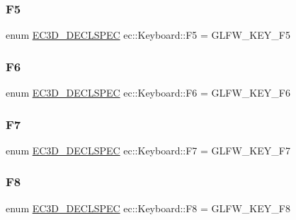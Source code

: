 \mbox{\label{classec_1_1_keyboard_a7a9bd546b5eeba38a587303293246bb7}} 
\subsubsection{\texorpdfstring{F5}{F5}}
{\footnotesize\ttfamily enum \mbox{\hyperlink{_common_8h_aac42573e202ca3dd4d259c81691e2369}{E\+C3\+D\+\_\+\+D\+E\+C\+L\+S\+P\+EC}} ec\+::\+Keyboard\+::\+F5 = G\+L\+F\+W\+\_\+\+K\+E\+Y\+\_\+\+F5}

\mbox{\label{classec_1_1_keyboard_a02fe21453cf1fd9a9c5f181ec9a8f714}} 
\subsubsection{\texorpdfstring{F6}{F6}}
{\footnotesize\ttfamily enum \mbox{\hyperlink{_common_8h_aac42573e202ca3dd4d259c81691e2369}{E\+C3\+D\+\_\+\+D\+E\+C\+L\+S\+P\+EC}} ec\+::\+Keyboard\+::\+F6 = G\+L\+F\+W\+\_\+\+K\+E\+Y\+\_\+\+F6}

\mbox{\label{classec_1_1_keyboard_ad0da55a468002a1193b02ab3b342a267}} 
\subsubsection{\texorpdfstring{F7}{F7}}
{\footnotesize\ttfamily enum \mbox{\hyperlink{_common_8h_aac42573e202ca3dd4d259c81691e2369}{E\+C3\+D\+\_\+\+D\+E\+C\+L\+S\+P\+EC}} ec\+::\+Keyboard\+::\+F7 = G\+L\+F\+W\+\_\+\+K\+E\+Y\+\_\+\+F7}

\mbox{\label{classec_1_1_keyboard_a89d166f0527389eb2eaec46dc1f86c79}} 
\subsubsection{\texorpdfstring{F8}{F8}}
{\footnotesize\ttfamily enum \mbox{\hyperlink{_common_8h_aac42573e202ca3dd4d259c81691e2369}{E\+C3\+D\+\_\+\+D\+E\+C\+L\+S\+P\+EC}} ec\+::\+Keyboard\+::\+F8 = G\+L\+F\+W\+\_\+\+K\+E\+Y\+\_\+\+F8}

